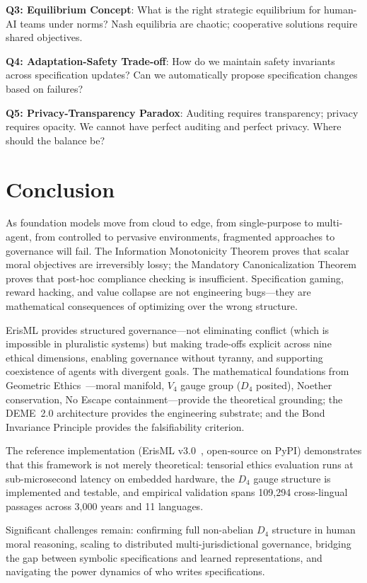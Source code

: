 \documentclass[conference]{IEEEtran}
\begin{document}
\textbf{Q3: Equilibrium Concept}: What is the right strategic
equilibrium for human-AI teams under norms? Nash equilibria are chaotic;
cooperative solutions require shared objectives.

\textbf{Q4: Adaptation-Safety Trade-off}: How do we maintain safety
invariants across specification updates? Can we automatically propose
specification changes based on failures?

\textbf{Q5: Privacy-Transparency Paradox}: Auditing requires
transparency; privacy requires opacity. We cannot have perfect auditing
and perfect privacy. Where should the balance be?

\section{Conclusion}
\label{sec:conclusion}

As foundation models move from cloud to edge, from single-purpose to
multi-agent, from controlled to pervasive environments, fragmented
approaches to governance will fail. The Information Monotonicity Theorem proves that scalar moral objectives are irreversibly lossy; the Mandatory Canonicalization Theorem proves that post-hoc compliance checking is insufficient. Specification gaming, reward hacking, and value collapse are not engineering bugs---they are mathematical consequences of optimizing over the wrong structure.

ErisML provides structured governance---not eliminating conflict (which
is impossible in pluralistic systems) but making trade-offs explicit
across nine ethical dimensions, enabling governance without tyranny, and supporting coexistence of
agents with divergent goals. The mathematical foundations from Geometric Ethics~\cite{bond2026ge}---moral manifold, $V_4$ gauge group ($D_4$ posited), Noether conservation, No Escape containment---provide the theoretical grounding; the DEME~2.0 architecture provides the engineering substrate; and the Bond Invariance Principle provides the falsifiability criterion.

The reference implementation (ErisML v3.0~\cite{bond2026erisml}, open-source on PyPI) demonstrates that this framework is not merely theoretical: tensorial ethics evaluation runs at sub-microsecond latency on embedded hardware, the $D_4$ gauge structure is implemented and testable, and empirical validation spans 109,294 cross-lingual passages across 3,000 years and 11 languages.

Significant challenges remain: confirming full non-abelian $D_4$ structure in human moral reasoning, scaling to distributed multi-jurisdictional governance, bridging the gap between symbolic specifications and learned representations, and navigating the power dynamics of who writes specifications.
\end{document}

